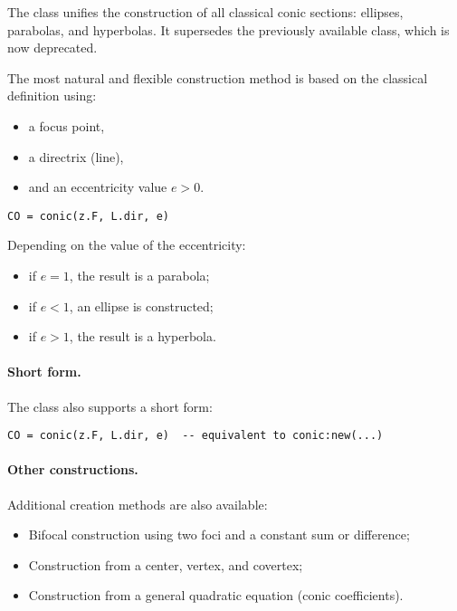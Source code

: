 The  class unifies the construction of all classical conic sections: ellipses, parabolas, and hyperbolas. It supersedes the previously available  class, which is now deprecated.

\vspace{1em}
The most natural and flexible construction method is based on the classical definition using:
\begin{itemize}
  \item a focus point,
  \item a directrix (line),
  \item and an eccentricity value \(e > 0\).
\end{itemize}

\begin{mybox}
\begin{verbatim}
CO = conic(z.F, L.dir, e)
\end{verbatim}
\end{mybox}

Depending on the value of the eccentricity:
\begin{itemize}
  \item if \(e = 1\), the result is a parabola;
  \item if \(e < 1\), an ellipse is constructed;
  \item if \(e > 1\), the result is a hyperbola.
\end{itemize}

\vspace{1em}
\paragraph{Short form.}
The class also supports a short form:
\begin{mybox}
\begin{verbatim}
CO = conic(z.F, L.dir, e)  -- equivalent to conic:new(...)
\end{verbatim}
\end{mybox}

\paragraph{Other constructions.}
Additional creation methods are also available:
\begin{itemize}
  \item Bifocal construction using two foci and a constant sum or difference;
  \item Construction from a center, vertex, and covertex;
  \item Construction from a general quadratic equation (conic coefficients).
\end{itemize}

